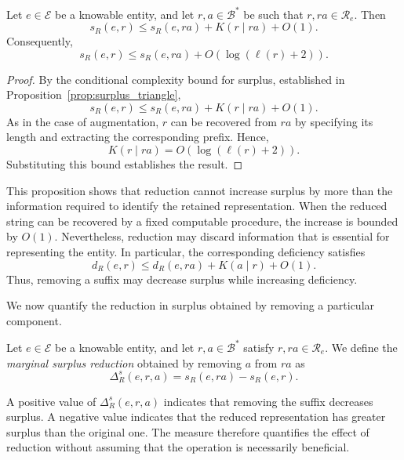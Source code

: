 \begin{proposition}
\label{prop:decrease_surplus_reduction}
Let $e\in\mathcal E$ be a knowable entity, and let $r,a\in\mathcal B^\ast$ be such that $r,ra\in\mathcal R_e$. Then
\[
s_R(e,r) \le s_R(e,ra) + K(r\mid ra) + O(1).
\]
Consequently,
\[
s_R(e,r) \le s_R(e,ra) + O(\log(\ell(r)+2)).
\]
\end{proposition}
\begin{proof}
By the conditional complexity bound for surplus, established in Proposition~\ref{prop:surplus_triangle},
\[
s_R(e,r) \le s_R(e,ra) + K(r\mid ra) + O(1).
\]
As in the case of augmentation, $r$ can be recovered from $ra$ by specifying its length and extracting the corresponding prefix. Hence,
\[
K(r\mid ra) = O(\log(\ell(r)+2)).
\]
Substituting this bound establishes the result.
\end{proof}

This proposition shows that reduction cannot increase surplus by more than the information required to identify the retained representation. When the reduced string can be recovered by a fixed computable procedure, the increase is bounded by $O(1)$. Nevertheless, reduction may discard information that is essential for representing the entity. In particular, the corresponding deficiency satisfies
\[
d_R(e,r)
\le
d_R(e,ra)+K(a\mid r)+O(1).
\]
Thus, removing a suffix may decrease surplus while increasing deficiency.

We now quantify the reduction in surplus obtained by removing a particular component.

\begin{definition}
\label{def:marginal_surplus_reduction}
Let $e\in\mathcal E$ be a knowable entity, and let $r,a\in\mathcal B^\ast$ satisfy $r,ra\in\mathcal R_e$. We define the \emph{marginal surplus reduction} obtained by removing $a$ from $ra$ as
\[
\Delta_R^s(e,r,a) = s_R(e,ra) - s_R(e,r).
\]
\end{definition}

A positive value of $\Delta_R^s(e,r,a)$ indicates that removing the suffix decreases surplus. A negative value indicates that the reduced representation has greater surplus than the original one. The measure therefore quantifies the effect of reduction without assuming that the operation is necessarily beneficial.


